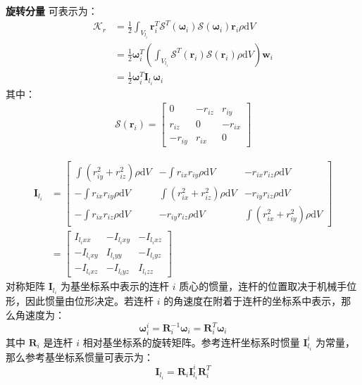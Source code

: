 \documentclass[cn,11pt,chinese,blue,bibstyle=ieeetr]{elegantbook}
\begin{document}
\textbf{旋转分量} 可表示为：
\begin{equation}\label{link_kinetic_energy_rotational_equation}
\begin{aligned}
\mathcal{K}_r &= \frac{1}{2} \int_{V_{l_i}} {\bm{r}_i^T {\bm{\mathcal{S}}^T \left(  \bm{\omega}_i \right)} {\bm{\mathcal{S}} \left(  \bm{\omega}_i \right)} \bm{r}_i \rho \mathrm{d}V}  \\
&= \frac{1}{2} \bm{\omega}_i^T \left( \int_{V_{l_i}} {{\bm{\mathcal{S}}^T \left( \bm{r}_i \right)} {\bm{\mathcal{S}} \left( \bm{r}_i \right)} \rho \mathrm{d}V} \right) \bm{w}_i \\
&= \frac{1}{2} \bm{\omega}_i^T \bm{I}_{l_i} \bm{\omega}_i
\end{aligned}
\end{equation}
其中：
\begin{equation}
\begin{aligned}
\bm{\mathcal{S}} \left( \bm{r}_i \right) = 
\begin{bmatrix}
0      & -r_{iz} & r_{iy} \\
r_{iz} & 0       & -r_{ix} \\
-r_{iy} & r_{ix}  & 0
\end{bmatrix}
\end{aligned}
\end{equation}

\begin{equation}
\begin{aligned}
\bm{I}_{l_i} &= 
\begin{bmatrix}
 \int {( r_{iy}^2 + r_{iz}^2) \rho \mathrm{d}V} & -\int {r_{ix} r_{iy} \rho \mathrm{d}V} & -{r_{ix} r_{iz} \rho \mathrm{d}V} \\
-\int {r_{ix} r_{iy} \rho \mathrm{d}V} &  \int {( r_{ix}^2 + r_{iz}^2) \rho \mathrm{d}V} & -{r_{iy} r_{iz} \rho \mathrm{d}V} \\
-\int {r_{ix} r_{iz} \rho \mathrm{d}V} & -{r_{iy} r_{iz} \rho \mathrm{d}V} &  \int {( r_{ix}^2 + r_{iy}^2) \rho \mathrm{d}V}
\end{bmatrix} \\
&= \begin{bmatrix}
 I_{{l_i}xx} & -I_{{l_i}xy} & -I_{{l_i}xz} \\
-I_{{l_i}xy} &  I_{{l_i}yy} & -I_{{l_i}yz} \\
-I_{{l_i}xz} & -I_{{l_i}yz} &  I_{{l_i}zz}
\end{bmatrix}
\end{aligned}
\end{equation}
对称矩阵 $\bm{I}_{l_i}$ 为基坐标系中表示的连杆 $i$ 质心的惯量，连杆的位置取决于机械手位形，因此惯量由位形决定。若连杆 $i$ 的角速度在附着于连杆的坐标系中表示，那么角速度为：
$$ \bm{\omega}_i^i = \bm{R}_i^{-1} \bm{\omega}_i = \bm{R}_i^T \bm{\omega}_i $$
其中 $\bm{R}_i$ 是连杆 $i$ 相对基坐标系的旋转矩阵。参考连杆坐标系时惯量 $\bm{I}_{l_i}^i$ 为常量，那么参考基坐标系惯量可表示为：
\begin{equation}
\bm{I}_{l_i} = \bm{R}_i \bm{I}_{l_i}^i \bm{R}_i^{T}
\end{equation}
\end{document}
